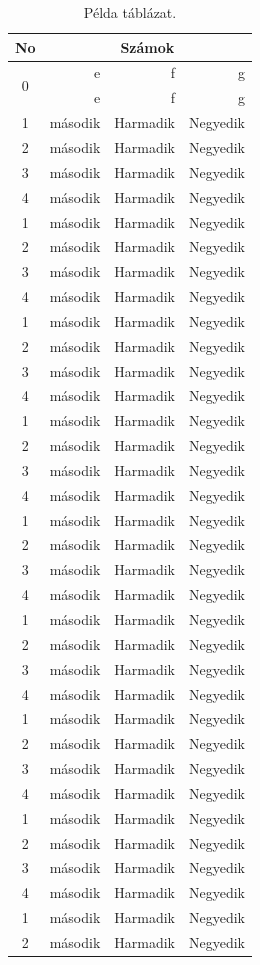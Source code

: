\documentclass[a4paper,12pt]{article} %
\begin{document}
\begin{table}[!b]
\centering
\begin{tabular}{c|rrr}
\hline
No & \multicolumn{3}{c}{ Számok}   \\
\hline
 
\multirow{2}{*}{0} & e & f & g \\
 & e & f & g \\
\hline 
1 & második  & Harmadik  & Negyedik  \\
2 & második  & Harmadik  & Negyedik  \\
3 & második  & Harmadik  & Negyedik  \\
4 & második  & Harmadik  & Negyedik  \\
1 & második  & Harmadik  & Negyedik  \\
2 & második  & Harmadik  & Negyedik  \\
3 & második  & Harmadik  & Negyedik  \\
4 & második  & Harmadik  & Negyedik  \\
1 & második  & Harmadik  & Negyedik  \\
2 & második  & Harmadik  & Negyedik  \\
3 & második  & Harmadik  & Negyedik  \\
4 & második  & Harmadik  & Negyedik  \\
1 & második  & Harmadik  & Negyedik  \\
2 & második  & Harmadik  & Negyedik  \\
3 & második  & Harmadik  & Negyedik  \\
4 & második  & Harmadik  & Negyedik  \\
1 & második  & Harmadik  & Negyedik  \\
2 & második  & Harmadik  & Negyedik  \\
3 & második  & Harmadik  & Negyedik  \\
4 & második  & Harmadik  & Negyedik  \\
1 & második  & Harmadik  & Negyedik  \\
2 & második  & Harmadik  & Negyedik  \\
3 & második  & Harmadik  & Negyedik  \\
4 & második  & Harmadik  & Negyedik  \\
1 & második  & Harmadik  & Negyedik  \\
2 & második  & Harmadik  & Negyedik  \\
3 & második  & Harmadik  & Negyedik  \\
4 & második  & Harmadik  & Negyedik  \\
1 & második  & Harmadik  & Negyedik  \\
2 & második  & Harmadik  & Negyedik  \\
3 & második  & Harmadik  & Negyedik  \\
4 & második  & Harmadik  & Negyedik  \\
1 & második  & Harmadik  & Negyedik  \\
2 & második  & Harmadik  & Negyedik  \\
\end{tabular}
\caption{Példa táblázat.}
\label{tab:elso}
\end{table}
\end{document}
